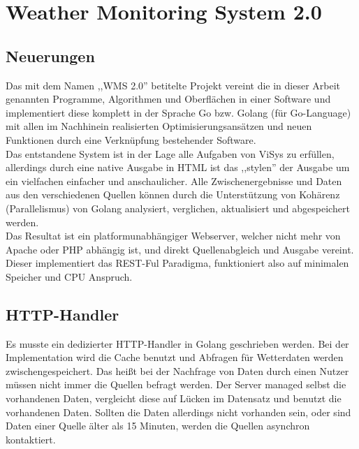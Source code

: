 \section{Weather Monitoring System 2.0}
\subsection{Neuerungen} %
Das mit dem Namen ,,WMS 2.0'' betitelte Projekt vereint die in dieser Arbeit genannten
Programme, Algorithmen und Oberflächen in einer Software und implementiert diese komplett
in der Sprache Go bzw. Golang (für Go-Language) mit allen im Nachhinein realisierten
Optimisierungsansätzen und neuen Funktionen durch eine Verknüpfung bestehender Software.\\
Das entstandene System ist in der Lage alle Aufgaben von ViSys zu erfüllen, allerdings durch
eine native Ausgabe in HTML ist das ,,stylen'' der Ausgabe um ein vielfachen einfacher und
anschaulicher. Alle Zwischenergebnisse und Daten aus den verschiedenen Quellen können durch
die Unterstützung von Kohärenz (Parallelismus) von Golang analysiert, verglichen, aktualisiert
und abgespeichert werden.\\
Das Resultat ist ein platformunabhängiger Webserver, welcher nicht mehr von Apache oder PHP
abhängig ist, und direkt Quellenabgleich und Ausgabe vereint. Dieser implementiert das REST-Ful
Paradigma, funktioniert also auf minimalen Speicher und CPU Anspruch. \\

\subsection{HTTP-Handler} %
Es musste ein dedizierter HTTP-Handler in Golang geschrieben werden. Bei der Implementation
wird die Cache benutzt und Abfragen für Wetterdaten werden zwischengespeichert. Das heißt bei der
Nachfrage von Daten durch einen Nutzer müssen nicht immer die Quellen befragt werden. Der Server
managed selbst die vorhandenen Daten, vergleicht diese auf Lücken im Datensatz und benutzt die
vorhandenen Daten. Sollten die Daten allerdings nicht vorhanden sein, oder sind Daten einer Quelle
älter als 15 Minuten, werden die Quellen asynchron kontaktiert.\\


